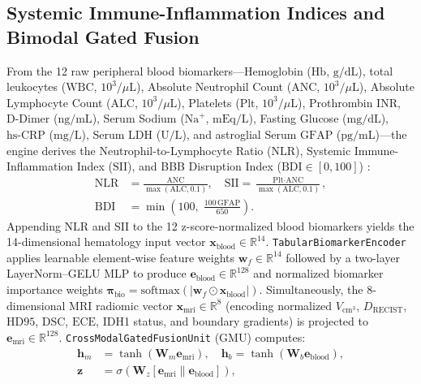 \documentclass[journal,onecolumn,10pt]{IEEEtran}
\begin{document}
\subsection{Systemic Immune-Inflammation Indices and Bimodal Gated Fusion}
From the 12 raw peripheral blood biomarkers---Hemoglobin ($\text{Hb}$, $\text{g/dL}$), total leukocytes ($\text{WBC}$, $10^3/\mu\text{L}$), Absolute Neutrophil Count ($\text{ANC}$, $10^3/\mu\text{L}$), Absolute Lymphocyte Count ($\text{ALC}$, $10^3/\mu\text{L}$), Platelets ($\text{Plt}$, $10^3/\mu\text{L}$), Prothrombin $\text{INR}$, D-Dimer ($\text{ng/mL}$), Serum Sodium ($\text{Na}^+$, $\text{mEq/L}$), Fasting Glucose ($\text{mg/dL}$), $\text{hs-CRP}$ ($\text{mg/L}$), Serum $\text{LDH}$ ($\text{U/L}$), and astroglial Serum $\text{GFAP}$ ($\text{pg/mL}$)---the engine derives the Neutrophil-to-Lymphocyte Ratio ($\text{NLR}$), Systemic Immune-Inflammation Index ($\text{SII}$), and BBB Disruption Index ($\text{BDI} \in [0, 100]$) \cite{bambury2013nlr, abdelrazeq2021sii, perez2021gfap}:
\begin{equation}
\begin{aligned}
    \text{NLR} &= \frac{\text{ANC}}{\max(\text{ALC}, 0.1)}, \quad \text{SII} = \frac{\text{Plt} \cdot \text{ANC}}{\max(\text{ALC}, 0.1)}, \\
    \text{BDI} &= \min\!\left(100,\; \frac{100\,\text{GFAP}}{650}\right).
\end{aligned}
    \label{eq:nlr_sii}
\end{equation}
Appending $\text{NLR}$ and $\text{SII}$ to the 12 z-score-normalized blood biomarkers yields the 14-dimensional hematology input vector $\mathbf{x}_{\text{blood}} \in \mathbb{R}^{14}$. \texttt{TabularBiomarkerEncoder} applies learnable element-wise feature weights $\mathbf{w}_f \in \mathbb{R}^{14}$ followed by a two-layer LayerNorm--GELU MLP to produce $\mathbf{e}_{\text{blood}} \in \mathbb{R}^{128}$ and normalized biomarker importance weights $\boldsymbol{\pi}_{\text{bio}} = \text{softmax}(|\mathbf{w}_f \odot \mathbf{x}_{\text{blood}}|)$. Simultaneously, the 8-dimensional MRI radiomic vector $\mathbf{x}_{\text{mri}} \in \mathbb{R}^8$ (encoding normalized $V_{\text{cm}^3}$, $D_{\text{RECIST}}$, $\text{HD95}$, $\text{DSC}$, $\text{ECE}$, IDH1 status, and boundary gradients) is projected to $\mathbf{e}_{\text{mri}} \in \mathbb{R}^{128}$. \texttt{CrossModalGatedFusionUnit} (GMU) \cite{arevalo2017gmu} computes:
\begin{equation}
\begin{aligned}
    \mathbf{h}_m &= \tanh(\mathbf{W}_m \mathbf{e}_{\text{mri}}), \quad \mathbf{h}_b = \tanh(\mathbf{W}_b \mathbf{e}_{\text{blood}}), \\
    \mathbf{z} &= \sigma\!\left(\mathbf{W}_z [\mathbf{e}_{\text{mri}} \| \mathbf{e}_{\text{blood}}]\right),
\end{aligned}
    \label{eq:gmu_gate}
\end{equation}
\end{document}

